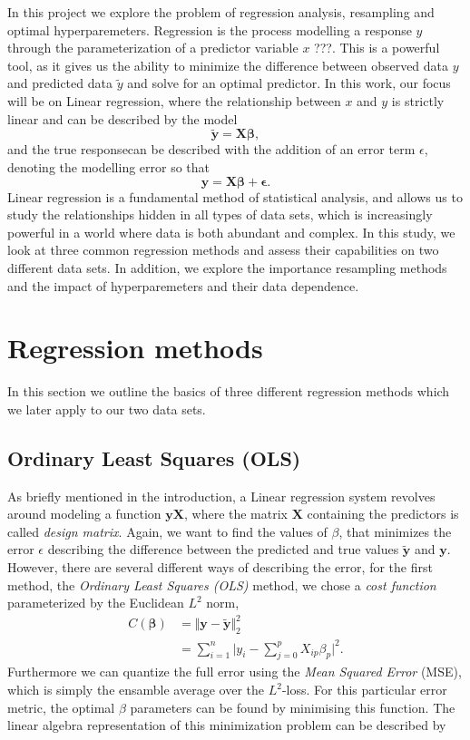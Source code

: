 \documentclass[a4paper, twocolumn]{article}
\begin{document}
In this project we explore the problem of regression analysis, resampling and optimal hyperparemeters. Regression is the process modelling a response $y$ through the parameterization of a predictor variable $x$ ???. This is a powerful tool, as it gives us the ability to minimize the difference between observed data $y$ and predicted data $\tilde{y}$ and solve for an optimal predictor. In this work, our focus will be on Linear regression, where the relationship between $x$ and $y$ is strictly linear and can be described by the model
\begin{equation}
  \mathbf{\tilde{y}} = \mathbf{X}\mathbf{\beta},
\end{equation}
and the true responsecan be described with the addition of an error term $\epsilon$, denoting the modelling error so that
\begin{equation}
  \mathbf{y} = \mathbf{X}\mathbf{\beta}+\mathbf{\epsilon}.
\end{equation}
Linear regression is a fundamental method of statistical analysis, and allows us to study the relationships hidden in all types of data sets, which is increasingly powerful in a world where data is both abundant and complex.
In this study, we look at three common regression methods and assess their capabilities on two different data sets. In addition, we explore the importance resampling methods and the impact of hyperparemeters and their data dependence.

\section{Regression methods}
In this section we outline the basics of three different regression methods which we later apply to our two data sets. 
\subsection{Ordinary Least Squares (OLS)}
As briefly mentioned in the introduction, a Linear regression system revolves around modeling a function $\mathbf{y}\mathbf{X}$, where the matrix $\mathbf{X}$ containing the predictors is called \textit{design matrix}. Again, we want to find the values of $\beta$, that minimizes the error $\epsilon$ describing the difference between the predicted and true values $\mathbf{\tilde{y}}$ and $\mathbf{y}$.
However, there are several different ways of describing the error, for the first method, the \textit{Ordinary Least Squares (OLS)} method, we chose a \textit{cost function} parameterized by the Euclidean $L^2$ norm,
\begin{align}
C(\bm\beta) &= \Vert \mathbf{y} - \tilde{\mathbf{y}}\Vert_2^2 \nonumber \\
&= \sum_{i=1}^n \Big| y_i - \sum_{j=0}^p X_{ip} \beta_p \Big|^2. \label{eq:cost}
\end{align}
Furthermore we can quantize the full error using the \textit{Mean Squared Error} (MSE), which is simply the ensamble average over the $L^2$-loss.
For this particular error metric, the optimal $\beta$ parameters can be found by minimising this function.
The linear algebra representation of this minimization problem can be described by
\end{document}
